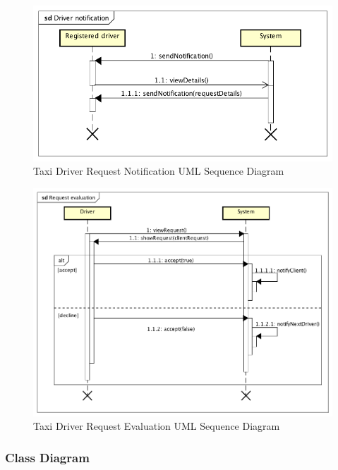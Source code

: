 \documentclass[a4paper]{article}
\begin{document}
\begin{enumerate}[label=\bfseries G\arabic*:]
\begin{figure}[H]
\includegraphics[width=\sequenceWidth]{Sequence-TaxiDriver-Notification}
\centering
\caption{Taxi Driver Request Notification UML Sequence Diagram}
\label{fig:sequencetaxidrivernotification}
\end{figure}

\begin{figure}[H]
\includegraphics[width=\sequenceWidth]{Sequence-TaxiDriver-RequestEvaluation}
\centering
\caption{Taxi Driver Request Evaluation UML Sequence Diagram}
\label{fig:sequencetaxidriverrequestevaluation}
\end{figure}

\subsubsection{Class Diagram}


\end{enumerate}
\end{document}
